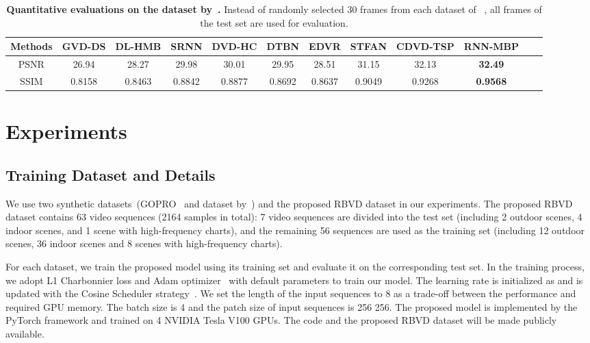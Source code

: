 \documentclass[letterpaper]{article} \usepackage{aaai22}  \usepackage{times}  \usepackage{helvet}  \usepackage{courier}  \usepackage[hyphens]{url}  \usepackage{graphicx} \urlstyle{rm} \def\UrlFont{\rm}  \usepackage{natbib}  \usepackage{caption} \DeclareCaptionStyle{ruled}{labelfont=normalfont,labelsep=colon,strut=off} \frenchspacing  \setlength{\pdfpagewidth}{8.5in}  \setlength{\pdfpageheight}{11in}  \newcommand{\hang}{\textcolor[rgb]{0.98,0.5,0.04}}
\begin{document}
\begin{table*}[!t] 
\centering
\vspace{-2mm}
\begin{adjustbox}{width=0.90\linewidth}
\begin{tabular}{c|c c c c c c c c c c c}
    \hline
    {\bf Methods}  & GVD-DS          & DL-HMB        & SRNN         & DVD-HC      & DTBN         & EDVR      & STFAN    & CDVD-TSP    & RNN-MBP           \\
    \hline  
    PSNR           & 26.94           & 28.27         & 29.98        & 30.01       & 29.95        & 28.51     & 31.15    & 32.13       & {\bf 32.49}    \\
    SSIM           & 0.8158          & 0.8463        & 0.8842       & 0.8877      & 0.8692       & 0.8637    & 0.9049   & 0.9268      & {\bf 0.9568}   \\
    \hline
\end{tabular}
\end{adjustbox}
\vspace{-2mm}
\caption{{\bf Quantitative evaluations on the dataset by~\cite{Su_2017_CVPR}.} Instead of randomly selected 30 frames from each dataset of ~\cite{Su_2017_CVPR}, all frames of the test set are used for evaluation.}
\label{DVDTable}
\vspace{-2mm}
\end{table*}


\section{Experiments}
\subsection{Training Dataset and Details}
We use two synthetic datasets~(GOPRO~\cite{deepdeblur} and dataset by~\cite{Su_2017_CVPR}) and the proposed RBVD dataset in our experiments.
The proposed RBVD dataset contains 63 video sequences (2164 samples in total): 7 video sequences are divided into the test set (including 2 outdoor scenes, 4 indoor scenes, and 1 scene with high-frequency charts), and the remaining 56 sequences are used as the training set (including 12 outdoor scenes, 36 indoor scenes and 8 scenes with high-frequency charts). 

For each dataset, we train the proposed model using its training set and evaluate it on the corresponding test set.
In the training process, we adopt L1 Charbonnier loss and Adam optimizer~\cite{2014Adam} with default parameters to train our model.
The learning rate is initialized as  and is updated with the Cosine Scheduler strategy~\cite{2016SGDR}. 
We set the length of the input sequences to 8 as a trade-off between the performance and required GPU memory. 
The batch size is 4 and the patch size of input sequences is 256  256.
The proposed model is implemented by the PyTorch framework and trained on 4 NVIDIA Tesla V100 GPUs.
The code and the proposed RBVD dataset will be made publicly available.
\end{document}
